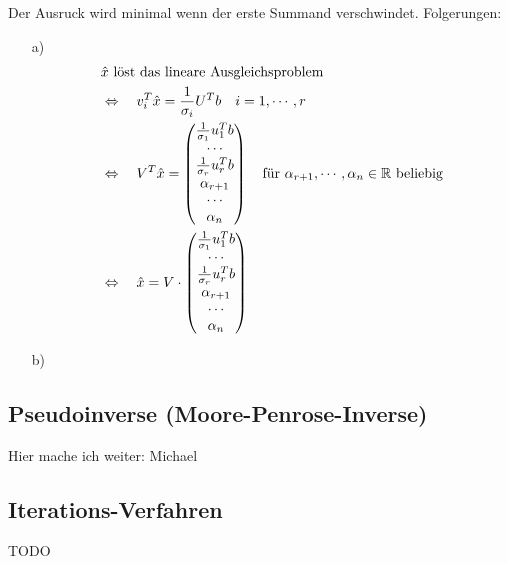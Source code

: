 Der Ausruck wird minimal wenn der erste Summand verschwindet. Folgerungen:
\begin{itemize}
  \item[a)]
  \begin{align*}
    & \hat{x} \text{ löst das lineare Ausgleichsproblem}\\
    & \Leftrightarrow \quad v_i^T \hat{x} = \frac{1}{\sigma_i} U^T b \quad i = 1, \cdots , r\\
    & \Leftrightarrow \quad V^T \hat{x} =
    \begin{pmatrix}
    \frac{1}{\sigma_1} u_1^T b\\ \cdots \\ \frac{1}{\sigma_r} u_r^T b \\
    \alpha_{r + 1} \\ \cdots \\ \alpha_n
    \end{pmatrix} \quad \text{für $\alpha_{r + 1}, \cdots , \alpha_n \in \mathbb R$ beliebig}\\
    & \Leftrightarrow \quad \hat{x} = V \cdot
    \begin{pmatrix}
    \frac{1}{\sigma_1} u_1^T b\\ \cdots \\ \frac{1}{\sigma_r} u_r^T b \\
    \alpha_{r + 1} \\ \cdots \\ \alpha_n
    \end{pmatrix}
  \end{align*}
  \item[b)]
\end{itemize}






\subsection{Pseudoinverse (Moore-Penrose-Inverse)}

Hier mache ich weiter: Michael

\subsection{Iterations-Verfahren}


TODO

